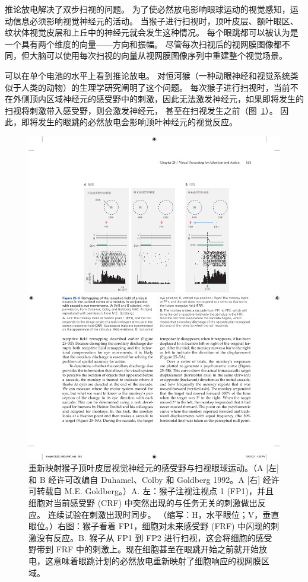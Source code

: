 推论放电解决了双步扫视的问题。
为了使必然放电影响眼球运动的视觉感知，运动信息必须影响视觉神经元的活动。
当猴子进行扫视时，顶叶皮层、额叶眼区、纹状体视觉皮层和上丘中的神经元就会发生这种情况。
每个眼跳都可以被认为是一个具有两个维度的向量——方向和振幅。
尽管每次扫视后的视网膜图像都不同，但大脑可以使用每次扫视的向量从视网膜图像序列中重建整个视觉场景。


可以在单个电池的水平上看到推论放电。
对恒河猴（一种动眼神经和视觉系统类似于人类的动物）的生理学研究阐明了这个问题。
每次猴子进行扫视时，当前不在外侧顶内区域神经元的感受野中的刺激，因此无法激发神经元，如果即将发生的扫视将刺激带入感受野，则会激发神经元， 甚至在扫视发生之前（图~\ref{fig:25_3}）。
因此，即将发生的眼跳的必然放电会影响顶叶神经元的视觉反应。


\begin{figure}[htbp]
	\centering
	\includegraphics[width=0.75\linewidth]{chap25/fig_25_3}
	\caption{重新映射猴子顶叶皮层视觉神经元的感受野与扫视眼球运动。（A [左] 和 B 经许可改编自 Duhamel、Colby 和 Goldberg 1992。A [右] 经许可转载自 M.E. Goldberg。）A. 左：猴子注视注视点 1 (FP1)，并且 细胞对当前感受野 (CRF) 中突然出现的与任务无关的刺激做出反应。 连续试验在刺激出现时同步。 （缩写：H，水平眼位；V，垂直眼位。）右图：猴子看着 FP1，细胞对未来感受野 (FRF) 中闪现的刺激没有反应。B. 猴子从 FP1 到 FP2 进行扫视，这会将细胞的感受野带到 FRF 中的刺激上。现在细胞甚至在眼跳开始之前就开始放电，这意味着眼跳计划的必然放电重新映射了细胞响应的视网膜区域。}
	\label{fig:25_3}
\end{figure}


